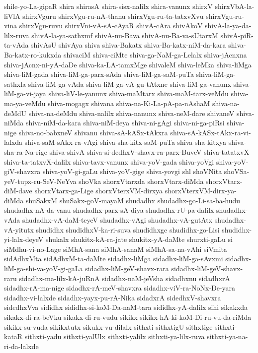 {shile-yo-La-gipaR
shira
shirasA
shira-sisx-nalilx
shira-vanunx
shirxV
shirxVbA-la-liVlA
shirxVguru
shirxVgu-ru-nA-thanu
shirxVgu-ru-ta-tatxvXvu
shirxVgu-ru-vina
shirxVgu-ruvu
shirxVni-vA-sA-cAyaR
shivA-cAra
shivAkoV
shivA-la-ya-da-lilx-ruva
shivA-la-ya-sathxmf
shivA-nu-Bava
shivA-nu-Ba-va-sUtarxM
shivA-piR-ta-vAda
shivAsU
shivAya
shiva
shiva-Bakatx
shiva-Ba-katx-niM-da-kara
shiva-Ba-katx-ro-kukxda
shivaciM
shiva-ciMte
shiva-ga-NaM-ga-Lelalx
shiva-jAcnxna
shiva-jAcnx-ni-yA-daDe
shiva-ka-LA-tamxMge
shivaleM
shiva-leMka
shiva-liMga
shiva-liM-gada
shiva-liM-ga-parx-sAda
shiva-liM-ga-saM-puTa
shiva-liM-ga-sathxla
shiva-liM-ga-vAda
shiva-liM-ga-vA-gu-tAtxne
shiva-liM-ga-vanunx
shiva-liM-ga-vi-jaya
shiva-liV-le-yanunx
shiva-maMtarx
shiva-maM-tarx-veMdu
shiva-ma-ya-veMdu
shiva-mogagx
shivana
shiva-na-Ki-La-pA-pa-nAshaM
shiva-na-deMdU
shiva-na-deMdu
shiva-nalilx
shiva-nanunx
shiva-neM-dare
shivaneV
shiva-niMda
shiva-niM-da-kara
shiva-niM-deya
shiva-ni-gAgi
shiva-ni-ga-piRsi
shiva-nige
shiva-no-babxneV
shivanu
shiva-sA-kASx-tAkxra
shiva-sA-kASx-tAkx-ra-vi-lalxda
shiva-saM-sAkx-ra-vAgi
shiva-sha-kitx-saM-puTa
shiva-sha-kitxya
shiva-sha-ra-Na-rige
shiva-shivA
shiva-si-dedhxV-shavx-ra-parx-BuveV
shiva-tatatxvX
shiva-ta-tatxvX-dalilx
shiva-tavx-vanunx
shiva-yoV-gada
shiva-yoVgi
shiva-yoV-giV-shavxra
shiva-yoV-gi-gaLu
shiva-yoV-gige
shiva-yovgi
shl
shoVNita
shoVSa-yeV-tupx-ru-SeV-NeYva
shoVka
shorxVtarxda
shorxVtarx-diMda
shorxVtarx-diM-dave
shorxVtarx-ga-Lige
shorxVterxVM-dirxya
shorxVterxVM-dirx-ya-diMda
shuSakxM
shuSakx-goV-mayaM
shudadhx
shudadhx-go-Li-sa-ba-hudu
shudadhx-nA-da-vanu
shudadhx-parx-sA-diya
shudadhx-rU-pa-dalilx
shudadhx-vAda
shudadhx-vA-daM-teyeV
shudadhx-vAgi
shudadhx-vA-gutAtx
shudadhx-vA-yitutx
shudidhx
shudidhxV-ka-ri-suva
shudidhxge
shudidhx-go-Lisi
shudidhx-yi-lalx-deyeV
shukalx
shukitx-kA-ra-jate
shukitx-yA-daMte
shurxti-gaLu
si
siMdhu-vi-no-Lage
siMhA-sana
siMhA-sanaM
siMhA-sa-na-vAhi
siVmita
sidAdhxMta
sidAdhxM-ta-daMte
sidadhx-liMga
sidadhx-liM-ga-sAvxmi
sidadhx-liM-ga-shi-va-yoV-gi-gaLa
sidadhx-liM-geV-shavx-rara
sidadhx-liM-geV-shavx-raru
sidadhx-ma-lilx-kA-juRnA
sidadhx-naM-jeVsha
sidadhxnu
sidadhxrA
sidadhx-rA-ma-nige
sidadhx-rA-meV-shavxra
sidadhx-viV-ra-NoNx-De-yara
sidadhx-vi-lalxde
sidadhx-yayx-pu-rA-Nika
sidadxrA
sidedhxV-shavxra
sidedhxVva
sididhx
sididhx-si-koM-Da-naM-tara
sididhx-yA-dalilx
sihi
sikakxda
sikakx-di-ra-beVku
sikakx-di-ru-vudu
sikikx
sikikx-hA-ki-koM-Di-ru-vu-da-riMda
sikikx-su-vuda
sikikxtutx
sikukx-vu-dilalx
sithxti
sithxtigU
sithxtige
sithxti-kataR
sithxti-yadu
sithxti-yalUlx
sithxti-yalilx
sithxti-ya-lilx-ruva
sithxti-ya-na-ri-da-lalxde
}
